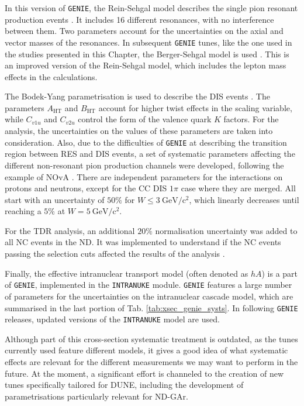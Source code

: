 In this version of \texttt{GENIE}, the Rein-Sehgal model describes the single pion resonant production events \cite{Rein1980}. It includes 16 different resonances, with no interference between them. Two parameters account for the uncertainties on the axial and vector masses of the resonances. In subsequent \texttt{GENIE} tunes, like the one used in the studies presented in this Chapter, the Berger-Sehgal model is used \cite{Berger2007}. This is an improved version of the Rein-Sehgal model, which includes the lepton mass effects in the calculations.

The Bodek-Yang parametrisation is used to describe the DIS events \cite{Bodek2002}. The parameters $A_{\mathrm{HT}}$ and $B_{\mathrm{HT}}$ account for higher twist effects in the scaling variable, while $C_{v1u}$ and $C_{v2u}$ control the form of the valence quark $K$ factors. For the analysis, the uncertainties on the values of these parameters are taken into consideration. Also, due to the difficulties of \texttt{GENIE} at describing the transition region between RES and DIS events, a set of systematic parameters affecting the different non-resonant pion production channels were developed, following the example of NOvA \cite{Sanchez2018}. There are independent parameters for the interactions on protons and neutrons, except for the CC DIS $1\pi$ case where they are merged. All start with an uncertainty of $50\%$ for $W \leq 3~\mathrm{GeV/c^{2}}$, which linearly decreases until reaching a $5\%$ at $W = 5~\mathrm{GeV/c^{2}}$.

For the TDR analysis, an additional $20\%$ normalisation uncertainty was added to all NC events in the ND. It was implemented to understand if the NC events passing the selection cuts affected the results of the analysis \cite{DUNE2021}.

Finally, the effective intranuclear transport model (often denoted as $hA$) is a part of \texttt{GENIE}, implemented in the \texttt{INTRANUKE} module. \texttt{GENIE} features a large number of parameters for the uncertainties on the intranuclear cascade model, which are summarised in the last portion of Tab. \ref{tab:xsec_genie_systs}. In following \texttt{GENIE} releases, updated versions of the \texttt{INTRANUKE} model are used.

Although part of this cross-section systematic treatment is outdated, as the tunes currently used feature different models, it gives a good idea of what systematic effects are relevant for the different measurements we may want to perform in the future. At the moment, a significant effort is channeled to the creation of new tunes specifically tailored for DUNE, including the development of parametrisations particularly relevant for ND-GAr.

